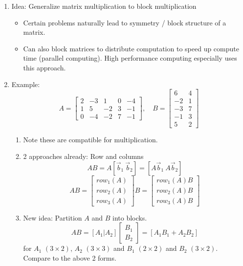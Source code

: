 \documentclass{article}
\begin{document}
\begin{enumerate}

\item Idea: Generalize matrix multiplication to block multiplication
\begin{itemize}
\item Certain problems naturally lead to symmetry / block structure of a matrix.
\item Can also block matrices to distribute computation to speed up compute time (parallel computing). High performance computing especially uses this approach.
\end{itemize}

\item Example:
\[
A = \left[
\begin{array}{cc|ccc}
2 & -3 & 1 & 0 & -4 \\
\hline
1 & 5 & -2 & 3 & -1 \\
0 & -4 & -2 & 7 & -1
\end{array}
\right], \quad
B = \left[
\begin{array}{cc}
6 & 4 \\
-2 & 1 \\
\hline
-3 & 7 \\
-1 & 3 \\
5 & 2 
\end{array}
\right]
\]
\begin{enumerate}
\item Note these are compatible for multiplication.
\item 2 approaches already: Row and columns
\[
AB = A[\vec{b}_1 ~ \vec{b}_2 ] = [A\vec{b}_1 ~ A\vec{b}_2]
\]
\[
AB = \left[
\begin{array}{c}
row_1(A) \\ row_2(A) \\ row_3(A)
\end{array}
\right] B
 = \left[
\begin{array}{c}
row_1(A)B \\ row_2(A)B \\ row_3(A)B
\end{array}
\right] 
\]
\item New idea: Partition $A$ and $B$ into blocks.
\[
AB = [A_1 | A_2] \left[
\begin{array}{c}
B_1 \\ \hline B_2
\end{array}
\right]
= [A_1B_1 + A_2B_2]
\]
for $A_1$ $(3 \times 2)$, $A_2$ $(3\times 3)$ and $B_1$ $(2\times 2)$ and $B_2$ $(3\times 2)$. Compare to the above 2 forms.

\end{enumerate}
\end{enumerate}
\end{document}
